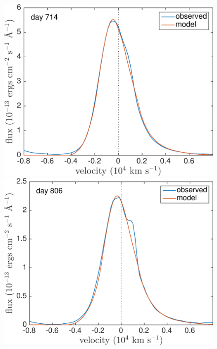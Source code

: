 \begin{figure}
\centering
\includegraphics[trim =0 0 0 0,clip=true,scale=0.4]{chapters/chapter5/images/smooth/best_fit/d714Ha_new.pdf}
\includegraphics[trim =25 0 0 0,clip=true,scale=0.4]{chapters/chapter5/images/smooth/best_fit/d806Ha_new.pdf}


\end{figure}

